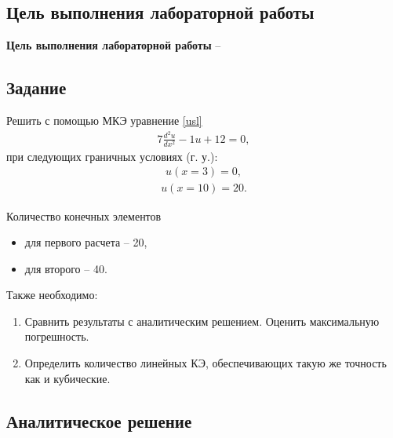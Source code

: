 \subsection{Цель выполнения лабораторной работы}\label{blockN.VariantM}
\textbf{Цель выполнения лабораторной работы }-- \GoalOfResearch

\subsection{Задание}

Решить с помощью МКЭ уравнение \ref{usl}
\begin{align}\label{usl}
7\frac{d^2u}{dx^2}    -1   u  + 12 
=0,
\end{align}
при следующих граничных условиях (г. у.): 
\begin{align}\label{1_gu}
    u(x=3) = 0,
\end{align}
\begin{align}\label{2_gu}
    u(x=10) = 20.
\end{align}

Количество конечных элементов
\begin{itemize}
    \item для первого расчета -- 20,
    \item для второго -- 40.
\end{itemize}

Также необходимо:
\begin{enumerate}
    \item Сравнить результаты с аналитическим решением. Оценить максимальную погрешность.
    \item Определить количество линейных КЭ, обеспечивающих такую же точность как и кубические.
\end{enumerate}

\newpage
\subsection{Аналитическое решение}

